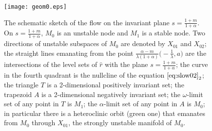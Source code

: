 \documentclass[a4paper,11pt]{article}
\def\blue{\color{blue}}
\theoremstyle{remark}
\begin{document}
\begin{figure}[ht]
 \centering
  \texttt{[image: geom0.eps]} \label{fig:flow0}
  \caption{The schematic sketch of the flow on the invariant plane $s=\frac{1+m}{1+\alpha}$.   On $s=\frac{1+m}{1+\alpha}$, $M_0$ is an unstable node and $M_1$ is a stable node. Two directions of unstable subspaces of $M_0$ are denoted by $X_{01}$ and $X_{02}$; the straight lines emanating from the 
  point $\frac{\alpha-m}{\lambda(1+\alpha)}\big(-\frac{1}{\lambda},a\big)$ are the intersections of the level sets of $\hat{r}$ 
  with the plane $s=\frac{1+m}{1+\alpha}$; the curve in the fourth quadrant is the nullcline of the equation $\eqref{eq:slow02}_2$; the triangle $T$ is a 2-dimensional positively invariant set; the trapezoid $A$ is a 2-dimensional negatively invariant set; the $\omega$-limit set of any point in $T$ is $M_1$; 
  the $\alpha$-limit set of any point in $A$ is $M_0$; in particular there is a heteroclinic orbit (green one) that {\blue emanates from} $M_0$ through $X_{01}$, {\blue the strongly unstable manifold of $M_0$.}} 
\end{figure}
\end{document}
